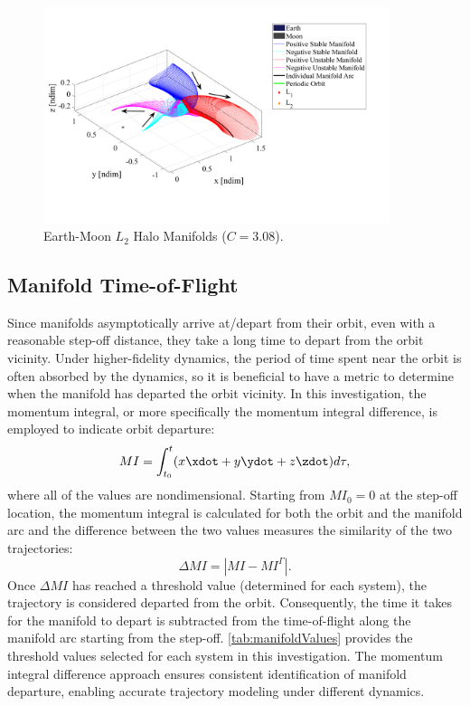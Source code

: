 \begin{figure}[H]
    \centering
    \includegraphics[width=0.9\textwidth]{figures/HaloManifold.pdf}
    \caption{Earth-Moon $L_{2}$ Halo Manifolds ($C=3.08$).}
    \label{fig:haloManifold}
\end{figure}

\subsection{Manifold Time-of-Flight}
Since manifolds asymptotically arrive at/depart from their orbit, even with a reasonable step-off
distance, they take a long time to depart from the orbit vicinity. Under higher-fidelity dynamics,
the period of time spent near the orbit is often absorbed by the dynamics, so it is beneficial to
have a metric to determine when the manifold has departed the orbit vicinity. In this
investigation, the momentum integral, or more specifically the momentum integral difference, is
employed to indicate orbit departure:
\begin{equation}
    MI=\int_{t_{0}}^{t}(x\xdot+y\ydot+z\zdot)d\tau,
    \label{eq:momentumintegral}
\end{equation}
where all of the values are nondimensional. Starting from $MI_{0}=0$ at the step-off location, the
momentum integral is calculated for both the orbit and the manifold arc and the difference between
the two values measures the similarity of the two trajectories:
\begin{equation}
    \Delta MI=|MI-MI^{\Gamma}|.
    \label{eq:momentumdifference}
\end{equation}
Once $\Delta MI$ has reached a threshold value (determined for each system), the trajectory is
considered departed from the orbit\cite{Guzzetti:2017}. Consequently, the time it takes for the
manifold to depart is subtracted from the time-of-flight along the manifold arc starting from the
step-off. \cref{tab:manifoldValues} provides the threshold values selected for each system in this
investigation. The momentum integral difference approach ensures consistent identification of
manifold departure, enabling accurate trajectory modeling under different dynamics.

